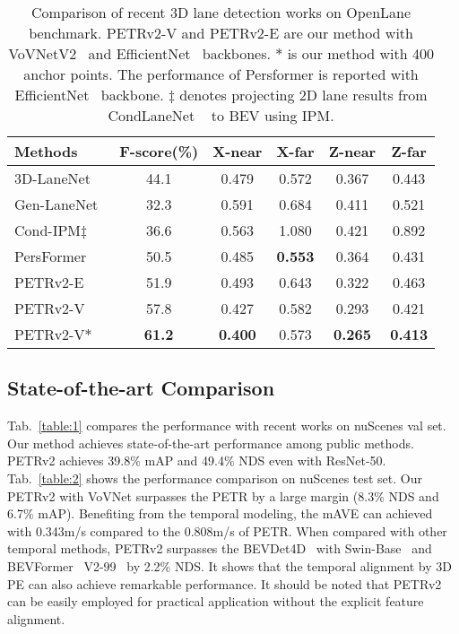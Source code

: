 \documentclass[10pt,twocolumn,letterpaper]{article}
\begin{document}
\begin{table}[t]
\begin{center}
\caption{Comparison of recent 3D lane detection works on OpenLane benchmark.
PETRv2-V and PETRv2-E are our method with VoVNetV2~\cite{lee2020centermask} and EfficientNet~\cite{tan2019efficientnet} backbones.
$\ast$ is our method with 400 anchor points. The performance of Persformer is reported with EfficientNet~\cite{tan2019efficientnet} backbone.
$\ddagger$ denotes projecting 2D lane results from CondLaneNet ~\cite{liu2021condlanenet} to BEV using IPM.}
\label{lane_compare}
\setlength{\tabcolsep}{2pt}
\begin{tabular}{l|ccccc}
\hline
Methods & F-score(\%)  & X-near & X-far & Z-near & Z-far  \\
\hline
3D-LaneNet~\cite{garnett20193d} & 44.1& 0.479 & 0.572 & 0.367 & 0.443   \\
Gen-LaneNet~\cite{guo2020gen} & 32.3 & 0.591 & 0.684 & 0.411 & 0.521 \\
Cond-IPM$\ddagger$ & 36.6 & 0.563 & 1.080 & 0.421 & 0.892 \\
PersFormer~\cite{chen2022persformer} & 50.5 & 0.485 & \textbf{0.553} & 0.364 & 0.431 \\
\hline
PETRv2-E & 51.9 & 0.493 & 0.643 & 0.322 & 0.463 \\
PETRv2-V & 57.8 & 0.427 & 0.582 & 0.293 & 0.421 \\
PETRv2-V$\ast$  & \textbf{61.2} & \textbf{0.400} & 0.573 & \textbf{0.265} & \textbf{0.413} \\

\hline
\end{tabular}
\end{center}
\vspace{-1.5em}
\end{table}

\subsection{State-of-the-art Comparison}
Tab.~\ref{table:1} compares the performance with recent works on nuScenes val set. Our method achieves state-of-the-art performance among public methods. PETRv2 achieves 39.8\% mAP and 49.4\% NDS even with ResNet-50. Tab.~\ref{table:2} shows the performance comparison on nuScenes test set. Our PETRv2 with VoVNet surpasses the PETR by a large margin (8.3\% NDS and 6.7\% mAP). Benefiting from the temporal modeling, the mAVE can achieved with 0.343m/s compared to the 0.808m/s of PETR. When compared with other temporal methods, PETRv2 surpasses the BEVDet4D~\cite{huang2022bevdet4d} with Swin-Base~\cite{liu2021swin} and BEVFormer~\cite{li2022bevformer} V2-99~\cite{lee2020centermask} by 2.2\% NDS. It shows that the temporal alignment by 3D PE can also achieve remarkable performance. It should be noted that PETRv2 can be easily employed for practical application without the explicit feature alignment. 
\end{document}

